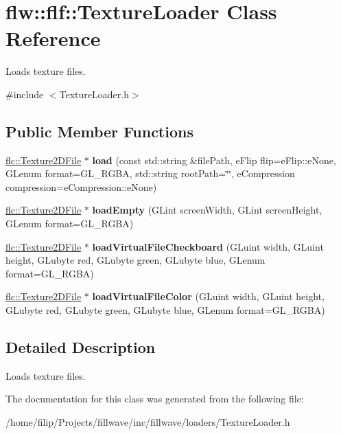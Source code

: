 \hypertarget{classflw_1_1flf_1_1TextureLoader}{}\section{flw\+:\+:flf\+:\+:Texture\+Loader Class Reference}
\label{classflw_1_1flf_1_1TextureLoader}


Loads texture files.  




{\ttfamily \#include $<$Texture\+Loader.\+h$>$}

\subsection*{Public Member Functions}
\begin{DoxyCompactItemize}
\item 
\hyperlink{classflw_1_1flc_1_1Texture2DFile}{flc\+::\+Texture2\+D\+File} $\ast$ {\bfseries load} (const std\+::string \&file\+Path, e\+Flip flip=e\+Flip\+::e\+None, G\+Lenum format=G\+L\+\_\+\+R\+G\+BA, std\+::string root\+Path=\char`\"{}\char`\"{}, e\+Compression compression=e\+Compression\+::e\+None)\hypertarget{classflw_1_1flf_1_1TextureLoader_a08a215b7d26dcb6c6128a90edf299dcd}{}\label{classflw_1_1flf_1_1TextureLoader_a08a215b7d26dcb6c6128a90edf299dcd}

\item 
\hyperlink{classflw_1_1flc_1_1Texture2DFile}{flc\+::\+Texture2\+D\+File} $\ast$ {\bfseries load\+Empty} (G\+Lint screen\+Width, G\+Lint screen\+Height, G\+Lenum format=G\+L\+\_\+\+R\+G\+BA)\hypertarget{classflw_1_1flf_1_1TextureLoader_abcbf6f3ab22585c88828d90568bb77ad}{}\label{classflw_1_1flf_1_1TextureLoader_abcbf6f3ab22585c88828d90568bb77ad}

\item 
\hyperlink{classflw_1_1flc_1_1Texture2DFile}{flc\+::\+Texture2\+D\+File} $\ast$ {\bfseries load\+Virtual\+File\+Checkboard} (G\+Luint width, G\+Luint height, G\+Lubyte red, G\+Lubyte green, G\+Lubyte blue, G\+Lenum format=G\+L\+\_\+\+R\+G\+BA)\hypertarget{classflw_1_1flf_1_1TextureLoader_afb9175c84f0289a3f4b580bac7254086}{}\label{classflw_1_1flf_1_1TextureLoader_afb9175c84f0289a3f4b580bac7254086}

\item 
\hyperlink{classflw_1_1flc_1_1Texture2DFile}{flc\+::\+Texture2\+D\+File} $\ast$ {\bfseries load\+Virtual\+File\+Color} (G\+Luint width, G\+Luint height, G\+Lubyte red, G\+Lubyte green, G\+Lubyte blue, G\+Lenum format=G\+L\+\_\+\+R\+G\+BA)\hypertarget{classflw_1_1flf_1_1TextureLoader_a0c68b9c45e42d3339f96587edcd0def4}{}\label{classflw_1_1flf_1_1TextureLoader_a0c68b9c45e42d3339f96587edcd0def4}

\end{DoxyCompactItemize}


\subsection{Detailed Description}
Loads texture files. 

The documentation for this class was generated from the following file\+:\begin{DoxyCompactItemize}
\item 
/home/filip/\+Projects/fillwave/inc/fillwave/loaders/Texture\+Loader.\+h\end{DoxyCompactItemize}

